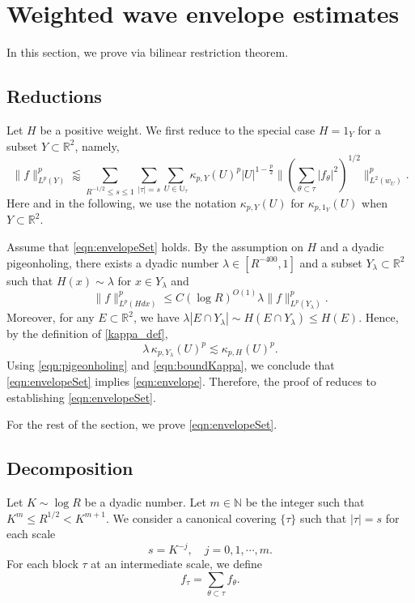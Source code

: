 \documentclass[11pt]{amsart}
\theoremstyle{definition}
\theoremstyle{remark}
\newcommand{\R}{\mathbb{R}}
\newcommand{\N}{\mathbb{N}}
\newcommand{\U}{\mathbb{U}}
\newcommand{\les}{\lesssim}
\newcommand{\less}{\lessapprox}
\newcommand{\la}{\lambda}
\begin{document}
\section{Weighted wave envelope estimates}\label{sec:bil}
In this section, we prove  via bilinear restriction theorem.

\subsection{Reductions}
Let $H$ be a positive weight.
We first reduce  to the special case $H=1_Y$ for a subset $Y\subset \R^2$, namely, 
\begin{equation}\label{eqn:envelopeSet}
	\| f \|_{L^p(Y)}^p  \less \sum_{R^{-1/2} \leq s\leq 1} \sum_{|\tau|=s} \sum_{U\in \U_{\tau}} \kappa_{p,Y}(U)^p |U|^{1-\frac{p}{2}} \| (\sum_{\theta \subset \tau} |f_{\theta}|^2 )^{1/2}  \|_{L^2(w_{U})}^p.
\end{equation}    
Here and in the following, we use the notation $\kappa_{p,Y}(U)$ for $\kappa_{p,1_Y}(U)$ when $Y\subset \R^2$.

Assume that \eqref{eqn:envelopeSet} holds. 
By the assumption on $H$ and a dyadic pigeonholing, there exists a dyadic number $\la\in [R^{-400},1]$ and a subset $Y_\la \subset \R^2$ such that $H(x)\sim \la$ for $x\in Y_{\la}$ and 
\begin{equation}\label{eqn:pigeonholing}
   \| f\|_{L^p(Hdx)}^p \le C(\log R)^{O(1)} \la \| f\|_{L^p(Y_{\la})}^p.
\end{equation}
Moreover, for any $E\subset \R^2$, we have $\lambda|E\cap Y_\la| \sim H(E\cap Y_\la) \leq H(E)$. Hence, by the definition of \eqref{kappa_def},
\begin{equation}\label{eqn:boundKappa}
   \lambda\, \kappa_{p,{Y_{\la}}}(U)^p\les \kappa_{p,H}(U)^p. 
\end{equation}
Using \eqref{eqn:pigeonholing} and \eqref{eqn:boundKappa}, we conclude that \eqref{eqn:envelopeSet} implies \eqref{eqn:envelope}. Therefore, the proof of  reduces to establishing \eqref{eqn:envelopeSet}.

For the rest of the section, we prove \eqref{eqn:envelopeSet}. 

\subsection{Decomposition}
Let $K\sim \log R$ be a dyadic number. Let $m\in \N$ be the integer such that $K^m \leq R^{1/2} < K^{m+1}$. We consider a canonical covering $\{\tau\}$ such that $|\tau|=s$ for each scale  
\[
s=K^{-j}, \quad j=0,1,\cdots,m.
\]
For each block $\tau$ at an intermediate scale, we define
\[f_{\tau} = \sum_{\theta \subset \tau} f_\theta.\]
\end{document}
